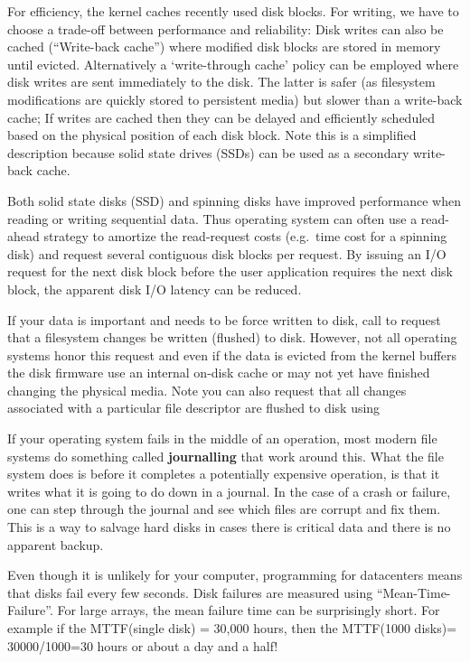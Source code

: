 For efficiency, the kernel caches recently used disk blocks. For writing, we have to choose a trade-off between performance and reliability: Disk writes can also be cached (``Write-back cache'') where modified disk blocks are stored in memory until evicted. Alternatively a `write-through cache' policy can be employed where disk writes are sent immediately to the disk. The latter is safer (as filesystem modifications are quickly stored to persistent media) but slower than a write-back cache; If writes are cached then they can be delayed and efficiently scheduled based on the physical position of each disk block. Note this is a simplified description because solid state drives (SSDs) can be used as a secondary write-back cache.

Both solid state disks (SSD) and spinning disks have improved performance when reading or writing sequential data. Thus operating system can often use a read-ahead strategy to amortize the read-request costs (e.g.~time cost for a spinning disk) and request several contiguous disk blocks per request. By issuing an I/O request for the next disk block before the user application requires the next disk block, the apparent disk I/O latency can be reduced.

If your data is important and needs to be force written to disk, call  to request that a filesystem changes be written (flushed) to disk. However, not all operating systems honor this request and even if the data is evicted from the kernel buffers the disk firmware use an internal on-disk cache or may not yet have finished changing the physical media. Note you can also request that all changes associated with a particular file descriptor are flushed to disk using 

If your operating system fails in the middle of an operation, most modern file systems do something called \textbf{journalling} that work around this. What the file system does is before it completes a potentially expensive operation, is that it writes what it is going to do down in a journal. In the case of a crash or failure, one can step through the journal and see which files are corrupt and fix them. This is a way to salvage hard disks in cases there is critical data and there is no apparent backup.

Even though it is unlikely for your computer, programming for datacenters means that disks fail every few seconds. Disk failures are measured using ``Mean-Time-Failure''. For large arrays, the mean failure time can be surprisingly short. For example if the MTTF(single disk) = 30,000 hours, then the MTTF(1000 disks)= 30000/1000=30 hours or about a day and a half!

